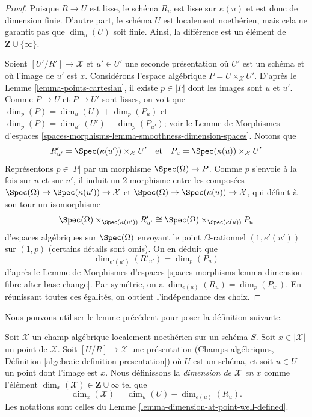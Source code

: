 \begin{proof}
Puisque $R \to U$ est lisse, le schéma $R_u$ est lisse sur $\kappa(u)$
et est donc de dimension finie. D'autre part, le schéma $U$
est localement noethérien, mais cela ne garantit pas que
$\dim_u(U)$ soit finie. Ainsi, la différence est un élément de
$\mathbf{Z} \cup \{\infty\}$.

\medskip\noindent
Soient $[U'/R'] \to \mathcal{X}$ et $u' \in U'$ une seconde présentation
où $U'$ est un schéma et où l'image de $u'$ est $x$. Considérons l'espace
algébrique $P = U \times_\mathcal{X} U'$. D'après le
Lemme \ref{lemma-points-cartesian}, il existe $p \in |P|$ dont les images sont
$u$ et $u'$. Comme $P \to U$ et $P \to U'$ sont lisses, on voit que
$\dim_p(P) = \dim_u(U) + \dim_p(P_u)$ et
$\dim_p(P) = \dim_{u'}(U') + \dim_p(P_{u'})$; voir le
Lemme de Morphismes d'espaces
\ref{spaces-morphisms-lemma-smoothness-dimension-spaces}.
Notons que
$$
R'_{u'} = \Spec(\kappa(u')) \times_\mathcal{X} U'
\quad\text{et}\quad
P_u = \Spec(\kappa(u)) \times_\mathcal{X} U'
$$
Représentons $p \in |P|$ par un morphisme $\Spec(\Omega) \to P$.
Comme $p$ s'envoie à la fois sur $u$ et sur $u'$, il induit un $2$-morphisme
entre les composées
$\Spec(\Omega) \to \Spec(\kappa(u')) \to \mathcal{X}$ et
$\Spec(\Omega) \to \Spec(\kappa(u)) \to \mathcal{X}$,
qui définit à son tour un isomorphisme
$$
\Spec(\Omega) \times_{\Spec(\kappa(u'))} R'_{u'}
\cong
\Spec(\Omega) \times_{\Spec(\kappa(u))} P_u
$$
d'espaces algébriques sur $\Spec(\Omega)$ envoyant le point $\Omega$-rationnel
$(1, e'(u'))$ sur $(1, p)$ (certains détails sont omis). On en déduit que
$$
\dim_{e'(u')}(R'_{u'}) = \dim_p(P_u)
$$
d'après le Lemme de Morphismes d'espaces
\ref{spaces-morphisms-lemma-dimension-fibre-after-base-change}.
Par symétrie, on a
$\dim_{e(u)}(R_u) = \dim_p(P_{u'})$.
En réunissant toutes ces égalités, on obtient l'indépendance des choix.
\end{proof}

\noindent
Nous pouvons utiliser le lemme précédent pour poser la définition suivante.

\begin{definition}
\label{definition-dimension-at-point}
Soit $\mathcal{X}$ un champ algébrique localement noethérien sur un schéma $S$.
Soit $x \in |\mathcal{X}|$ un point de $\mathcal{X}$.
Soit $[U/R] \to \mathcal{X}$ une présentation
(Champs algébriques, Définition \ref{algebraic-definition-presentation})
où $U$ est un schéma,
et soit $u \in U$ un point dont l'image est $x$.
Nous définissons la {\it dimension de $\mathcal{X}$ en $x$} comme
l'élément $\dim_x(\mathcal{X}) \in \mathbf{Z} \cup \infty$
tel que 
$$
\dim_x(\mathcal{X}) = \dim_u(U)-\dim_{e(u)}(R_u).
$$
Les notations sont celles du Lemme \ref{lemma-dimension-at-point-well-defined}.
\end{definition}

